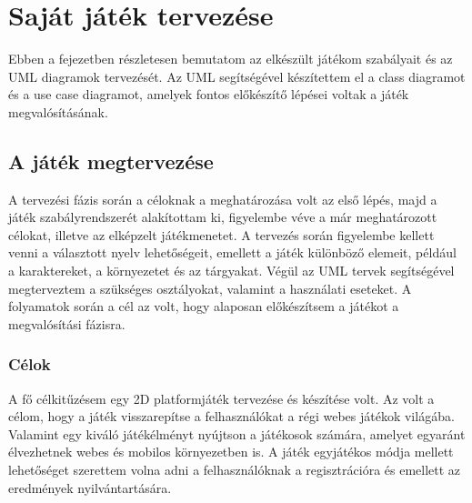 \documentclass[12pt, a4paper]{report}
\theoremstyle{definition}
\begin{document}
	\chapter{Saját játék tervezése}
	
	Ebben a fejezetben részletesen bemutatom az elkészült játékom szabályait és az UML diagramok tervezését. Az UML segítségével készítettem el a class diagramot és a use case diagramot, amelyek fontos előkészítő lépései voltak a játék megvalósításának. 
	
	\section{A játék megtervezése}
	A tervezési fázis során a céloknak a meghatározása volt az első lépés, majd a játék szabályrendszerét alakítottam ki, figyelembe véve a már meghatározott célokat, illetve az elképzelt játékmenetet. A tervezés során figyelembe kellett venni a választott nyelv lehetőségeit, emellett a játék különböző elemeit, például a karaktereket, a környezetet és az tárgyakat. Végül az UML tervek segítségével megterveztem a szükséges osztályokat, valamint a használati eseteket. A folyamatok során a cél az volt, hogy alaposan előkészítsem a játékot a megvalósítási fázisra.
		
	\subsection{Célok}
	A fő célkitűzésem egy 2D platformjáték tervezése és készítése volt. Az volt a célom, hogy a játék visszarepítse a felhasználókat a régi webes játékok világába. Valamint egy kiváló játékélményt nyújtson a játékosok számára, amelyet egyaránt élvezhetnek webes és mobilos környezetben is. A játék egyjátékos módja mellett lehetőséget szerettem volna adni a felhasználóknak a regisztrációra és emellett az eredmények nyilvántartására. 
	
\end{document}
